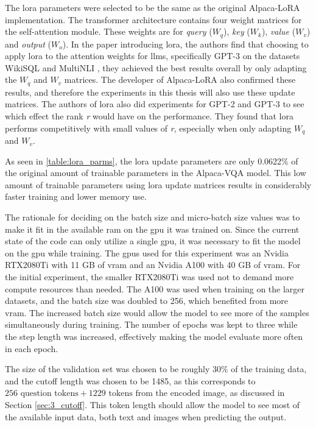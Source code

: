     The \gls{lora} parameters were selected to be the same as the original Alpaca-LoRA implementation. 
    The transformer architecture contains four weight matrices for the self-attention module. These weights are for \textit{query} ($W_q$), \textit{key} ($W_k$), \textit{value} ($W_v$) and \textit{output} ($W_o$).
    In the paper introducing \gls{lora}, the authors find that choosing to apply \gls{lora} to the attention weights for \glspl{llm}, specifically GPT-3 on the datasets WikiSQL \cite{zhongSeq2SQLGeneratingStructured2017} and MultiNLI \cite{williamsBroadCoverageChallengeCorpus2018}, they achieved the best results overall by only adapting the $W_q$ and $W_v$ matrices. The developer of Alpaca-LoRA also confirmed these results, and therefore the experiments in this thesis will also use these update matrices.
    The authors of \gls{lora} also did experiments for GPT-2 and GPT-3 to see which effect the rank \textit{r} would have on the performance. They found that \gls{lora} performs competitively with small values of \textit{r}, especially when only adapting $W_q$ and $W_v$.

    As seen in \autoref{table:lora_parms}, the \gls{lora} update parameters are only 0.0622\% of the original amount of trainable parameters in the Alpaca-VQA model. This low amount of trainable parameters using \gls{lora} update matrices results in considerably faster training and lower memory use.

    
    The rationale for deciding on the batch size and micro-batch size values was to make it fit in the available \gls{ram} on the \gls{gpu} it was trained on. Since the current state of the code can only utilize a single \gls{gpu}, it was necessary to fit the model on the \gls{gpu} while training. 
    The \glspl{gpu} used for this experiment was an Nvidia RTX2080Ti with 11 GB of \gls{vram} and an Nvidia A100 with 40 GB of \gls{vram}. For the initial experiment, the smaller RTX2080Ti was used not to demand more compute resources than needed. The A100 was used when training on the larger datasets, and the batch size was doubled to 256, which benefited from more \gls{vram}. The increased batch size would allow the model to see more of the samples simultaneously during training.
    The number of epochs was kept to three while the step length was increased, effectively making the model evaluate more often in each epoch.
    
    The size of the validation set was chosen to be roughly 30\% of the training data, and the cutoff length was chosen to be 1485, as this corresponds to $256 \text{ question tokens} + 1229 \text{ tokens from the encoded image}$, as discussed in Section \ref{sec:3_cutoff}. This token length should allow the model to see most of the available input data, both text and images when predicting the output.

